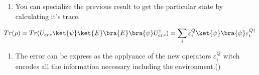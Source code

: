 \begin{enumerate}[resume]
\item You can specialize the previous result to get the particular state by calculating it's trace.
\end{enumerate}

\begin{equation}
Tr(\rho) = Tr(U_{err}\ket{\psi}\ket{E}\bra{E}\bra{\psi}U_{err}^\dagger) = \sum_i \varepsilon_i^Q \ket{\psi} \bra{\psi} \varepsilon_i^{Q\dagger}
\end{equation}

\begin{enumerate}[resume]
\item The error can be express as the applyance of the new operators $\varepsilon_i^Q$ witch encodes all the information necessary including the environment.(\cite{Mosca2007})
\end{enumerate}

